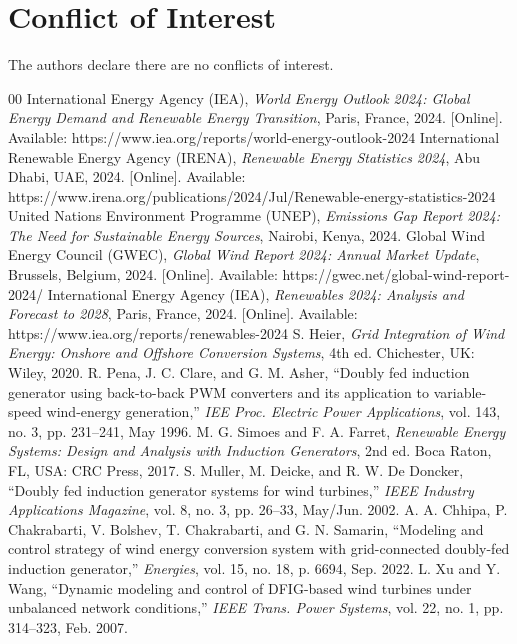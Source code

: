 \documentclass[conference]{IEEEtran}
\begin{document}
\section*{Conflict of Interest}
The authors declare there are no conflicts of interest.

\begin{thebibliography}{00}
 International Energy Agency (IEA), \textit{World Energy Outlook 2024: Global Energy Demand and Renewable Energy Transition}, Paris, France, 2024. [Online]. Available: https://www.iea.org/reports/world-energy-outlook-2024
 International Renewable Energy Agency (IRENA), \textit{Renewable Energy Statistics 2024}, Abu Dhabi, UAE, 2024. [Online]. Available: https://www.irena.org/publications/2024/Jul/Renewable-energy-statistics-2024
 United Nations Environment Programme (UNEP), \textit{Emissions Gap Report 2024: The Need for Sustainable Energy Sources}, Nairobi, Kenya, 2024.
 Global Wind Energy Council (GWEC), \textit{Global Wind Report 2024: Annual Market Update}, Brussels, Belgium, 2024. [Online]. Available: https://gwec.net/global-wind-report-2024/
 International Energy Agency (IEA), \textit{Renewables 2024: Analysis and Forecast to 2028}, Paris, France, 2024. [Online]. Available: https://www.iea.org/reports/renewables-2024
 S. Heier, \textit{Grid Integration of Wind Energy: Onshore and Offshore Conversion Systems}, 4th ed. Chichester, UK: Wiley, 2020.
 R. Pena, J. C. Clare, and G. M. Asher, ``Doubly fed induction generator using back-to-back PWM converters and its application to variable-speed wind-energy generation,'' \textit{IEE Proc. Electric Power Applications}, vol. 143, no. 3, pp. 231--241, May 1996.
 M. G. Simoes and F. A. Farret, \textit{Renewable Energy Systems: Design and Analysis with Induction Generators}, 2nd ed. Boca Raton, FL, USA: CRC Press, 2017.
 S. Muller, M. Deicke, and R. W. De Doncker, ``Doubly fed induction generator systems for wind turbines,'' \textit{IEEE Industry Applications Magazine}, vol. 8, no. 3, pp. 26--33, May/Jun. 2002.
 A. A. Chhipa, P. Chakrabarti, V. Bolshev, T. Chakrabarti, and G. N. Samarin, ``Modeling and control strategy of wind energy conversion system with grid-connected doubly-fed induction generator,'' \textit{Energies}, vol. 15, no. 18, p. 6694, Sep. 2022.
 L. Xu and Y. Wang, ``Dynamic modeling and control of DFIG-based wind turbines under unbalanced network conditions,'' \textit{IEEE Trans. Power Systems}, vol. 22, no. 1, pp. 314--323, Feb. 2007.

\end{thebibliography}
\end{document}
